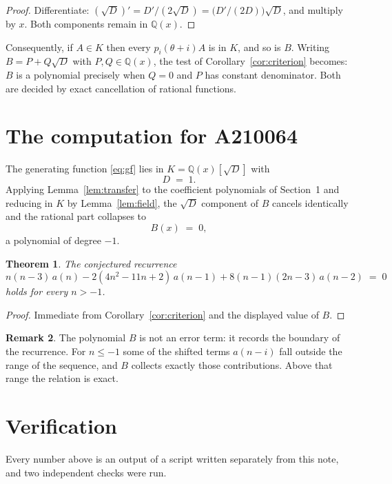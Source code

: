\documentclass[11pt,a4paper]{article}
\theoremstyle{plain}
\newtheorem{theorem}{Theorem}
\theoremstyle{definition}
\newtheorem{remark}[theorem]{Remark}
\begin{document}
\begin{proof}
Differentiate: $(\sqrt{D})'=D'/(2\sqrt{D})=\bigl(D'/(2D)\bigr)\sqrt{D}$, and multiply by
$x$. Both components remain in $\mathbb{Q}(x)$.
\end{proof}

Consequently, if $A\in K$ then every $p_{i}(\theta+i)A$ is in $K$, and so is $B$. Writing
$B=P+Q\sqrt{D}$ with $P,Q\in\mathbb{Q}(x)$, the test of Corollary~\ref{cor:criterion}
becomes: $B$ is a polynomial precisely when $Q=0$ and $P$ has constant denominator. Both
are decided by exact cancellation of rational functions.

\section{The computation for A210064}

The generating function \eqref{eq:gf} lies in $K=\mathbb{Q}(x)[\sqrt{D}]$ with
\[
D \;=\; 1 .
\]
Applying Lemma~\ref{lem:transfer} to the coefficient polynomials of Section~1 and reducing
in $K$ by Lemma~\ref{lem:field}, the $\sqrt{D}$ component of $B$ cancels identically and
the rational part collapses to
\[
B(x)\;=\;0 ,
\]
a polynomial of degree $-1$.

\begin{theorem}
The conjectured recurrence
\[
n \left(n - 3\right)\,a(n) -  2 \left(4 n^{2} - 11 n + 2\right)\,a(n-1) + 8 \left(n - 1\right) \left(2 n - 3\right)\,a(n-2) \;=\;0
\]
holds for every $n>-1$.
\end{theorem}

\begin{proof}
Immediate from Corollary~\ref{cor:criterion} and the displayed value of $B$.
\end{proof}

\begin{remark}
The polynomial $B$ is not an error term: it records the boundary of the recurrence. For
$n\le-1$ some of the shifted terms $a(n-i)$ fall outside the range of the sequence,
and $B$ collects exactly those contributions. Above that range the relation is exact.
\end{remark}

\section{Verification}

Every number above is an output of a script written separately from this note, and two
independent checks were run.
\end{document}
